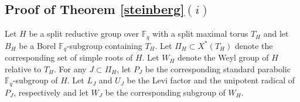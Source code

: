 \documentclass{amsart}
\theoremstyle{plain}
\newtheorem{proposition}{Proposition}[section]
\newtheorem{lemma}[theorem]{Lemma}
\theoremstyle{definition}
\theoremstyle{remark}
\DeclareMathOperator{\rk}{rk}
\begin{document}

\subsection{Proof of Theorem \ref{steinberg}$(i)$}
Let $H$ be a split reductive group over $\mathbb{F}_{q}$ with a split maximal torus $T_{H}$ and let $B_{H}$ be a Borel $\mathbb{F}_{q}$-subgroup containing $T_H$. Let $\Pi_{H}\subset X^{*}(T_{H})$ denote the corresponding set of simple roots of $H$. 
Let $W_H$ denote the Weyl group of $H$ relative to $T_H$. 
For any $J\subset \Pi_H$, let $P_J$ be the corresponding standard parabolic $\mathbb{F}_{q}$-subgroup of $H$. Let $L_{J}$ and $U_{J}$ be the Levi factor and the unipotent radical of $P_{J}$, respectively and let $W_J$ be the corresponding subgroup of $W_H$. 
\end{document}
